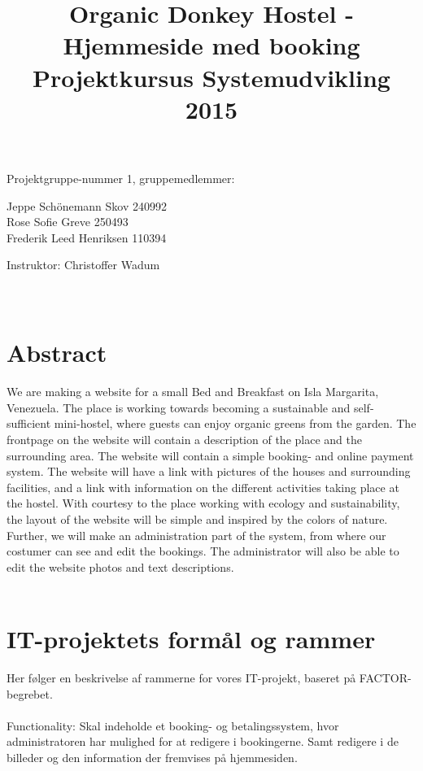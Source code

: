 \documentclass[12pt,a4paper]{article}
\begin{document}
\title{Organic Donkey Hostel - Hjemmeside med booking\\
Projektkursus Systemudvikling 2015}
\maketitle
\begin{center}
Projektgruppe-nummer 1, gruppemedlemmer:
\end{center}
\begin{center}
Jeppe Schönemann Skov 240992\\
Rose Sofie Greve 250493\\
Frederik Leed Henriksen 110394\\
\end{center}
\begin{center}
Instruktor: Christoffer Wadum\\ \hfill \\ \hfill \\ 
\end{center}
\newpage
\tableofcontents
\newpage
\section{Abstract}
We are making a website for a small Bed and Breakfast on Isla Margarita, Venezuela. The place is working towards becoming a sustainable and self-sufficient mini-hostel, where guests can enjoy organic greens from the garden.
The frontpage on the website will contain a description of the place and the surrounding area.
The website will contain a simple booking- and online payment system.
The website will have a link with pictures of the houses and surrounding facilities, and a link with information on the different activities taking place at the hostel.
With courtesy to the place working with ecology and sustainability, the layout of the website will be simple and inspired by the colors of nature.
Further, we will make an administration part of the system, from where our costumer can see and edit the bookings. The administrator will also be able to edit the website photos and text descriptions. \\\\
\newpage
\section{IT-projektets formål og rammer}
Her følger en beskrivelse af rammerne for vores IT-projekt, baseret på FACTOR-begrebet.
\\\\
Functionality: Skal indeholde et booking- og betalingssystem, hvor administratoren har mulighed for at redigere i bookingerne. Samt redigere i de billeder og den information der fremvises på hjemmesiden. \\
\end{document}

